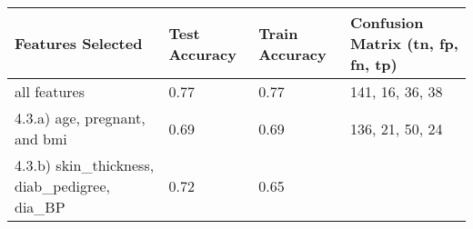 \documentclass[11pt]{article}
\begin{document}
\begin{longtable}[]{@{}llll@{}}
\toprule
\begin{minipage}[b]{0.22\columnwidth}\raggedright
Features Selected\strut
\end{minipage} & \begin{minipage}[b]{0.22\columnwidth}\raggedright
Test Accuracy\strut
\end{minipage} & \begin{minipage}[b]{0.22\columnwidth}\raggedright
Train Accuracy\strut
\end{minipage} & \begin{minipage}[b]{0.22\columnwidth}\raggedright
Confusion Matrix (tn, fp, fn, tp)\strut
\end{minipage}\tabularnewline
\midrule
\endhead
\begin{minipage}[t]{0.22\columnwidth}\raggedright
all features\strut
\end{minipage} & \begin{minipage}[t]{0.22\columnwidth}\raggedright
0.77\strut
\end{minipage} & \begin{minipage}[t]{0.22\columnwidth}\raggedright
0.77\strut
\end{minipage} & \begin{minipage}[t]{0.22\columnwidth}\raggedright
141, 16, 36, 38\strut
\end{minipage}\tabularnewline
\begin{minipage}[t]{0.22\columnwidth}\raggedright
4.3.a) age, pregnant, and bmi\strut
\end{minipage} & \begin{minipage}[t]{0.22\columnwidth}\raggedright
0.69\strut
\end{minipage} & \begin{minipage}[t]{0.22\columnwidth}\raggedright
0.69\strut
\end{minipage} & \begin{minipage}[t]{0.22\columnwidth}\raggedright
136, 21, 50, 24\strut
\end{minipage}\tabularnewline
\begin{minipage}[t]{0.22\columnwidth}\raggedright
4.3.b) skin\_thickness, diab\_pedigree, dia\_BP\strut
\end{minipage} & \begin{minipage}[t]{0.22\columnwidth}\raggedright
0.72\strut
\end{minipage} & \begin{minipage}[t]{0.22\columnwidth}\raggedright
0.65\strut

\end{minipage}
\end{longtable}
\end{document}
